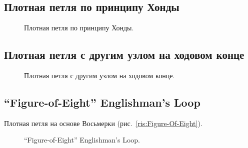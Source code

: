 \subsection{Плотная петля по принципу Хонды}

\begin{figure}[H]\centering
	\begin{minipage}{1\linewidth}
		\begin{center}
			\tcbox[enhanced jigsaw,colframe=black,opacityframe=0.5,opacityback=0.5]
			{\centering{}}
		\end{center}
	\end{minipage}
\caption{Плотная петля по принципу Хонды.}
\label{ris:Plotnaya_Honda}
\end{figure}

\subsection{Плотная петля с другим узлом на ходовом конце}

\begin{figure}[H]\centering
	\begin{minipage}{1\linewidth}
		\begin{center}
			\tcbox[enhanced jigsaw,colframe=black,opacityframe=0.5,opacityback=0.5]
			{\centering{}}
		\end{center}
	\end{minipage}
\caption{Плотная петля с другим узлом на ходовом конце.}
\label{ris:Plotnaya_drugoi_uzel}
\end{figure}

\subsection{\enquote{Figure-of-Eight} Englishman's Loop}

Плотная петля на основе Восьмерки (рис.~\ref{ris:Figure-Of-Eight}).

\begin{figure}[H]\centering
	\subfloat[Завязывание]{\label{ris:Figure-of-Eight_Englishman_Loop_1}
	\tcbox[enhanced jigsaw,colframe=black,opacityframe=0.5,opacityback=0.5]
		{\centering
			}
		}
\end{figure}

\begin{figure}[H]\centering
	\subfloat[Результат]{\label{ris:Figure-of-Eight_Englishman_Loop_2}
	\tcbox[enhanced jigsaw,colframe=black,opacityframe=0.5,opacityback=0.5]
		{\centering
			}
		}
	\caption{\enquote{Figure-of-Eight} Englishman's Loop.}\label{ris:Figure-of-Eight_Englishman_Loop}
\end{figure}

